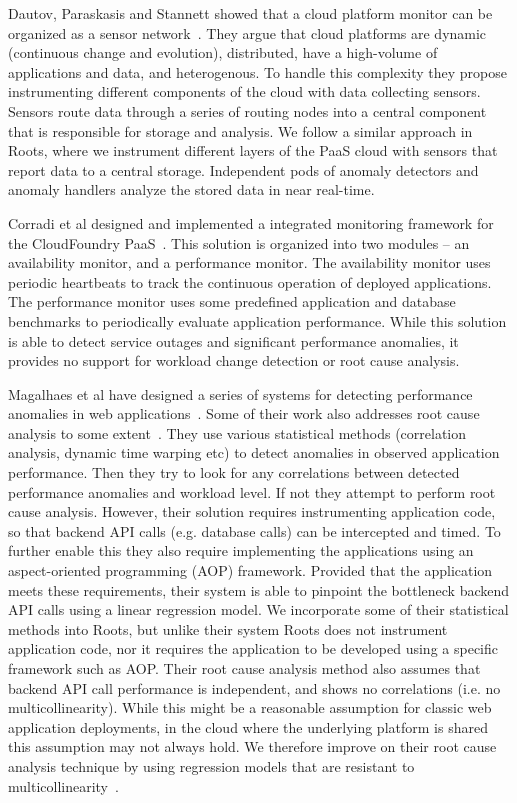 Dautov, Paraskasis and Stannett showed that a cloud platform monitor
can be organized as a sensor network~\cite{Dautov2014}. 
They argue that cloud platforms are 
dynamic (continuous change and evolution), distributed, have a high-volume
of applications and data, and heterogenous. To handle this complexity
they propose instrumenting different components of the cloud with
data collecting sensors. Sensors route data through a series of routing 
nodes into a central component that is responsible for storage
and analysis. We follow a similar approach in Roots, where we
instrument different layers of the PaaS cloud with sensors that
report data to a central storage. Independent pods of anomaly
detectors and anomaly handlers analyze the stored data in near
real-time.

Corradi et al designed and implemented a integrated monitoring
framework for the CloudFoundry PaaS~\cite{6912627}. This solution is organized
into two modules -- an availability monitor, and a performance
monitor. The availability monitor uses periodic heartbeats to
track the continuous operation of deployed applications. The
performance monitor uses some predefined application and
database benchmarks to periodically evaluate application performance.
While this solution is able to detect service outages and significant
performance anomalies, it provides no support for workload change
detection or root cause analysis.

Magalhaes et al have designed a series of systems for detecting
performance anomalies in web applications~\cite{5598229}. Some of their work
also addresses root cause analysis to some extent~\cite{Magalhaes:2011:RAP:1982185.1982234}. 
They use
various statistical methods (correlation analysis, dynamic time
warping etc) to detect anomalies in observed application
performance. Then they try to look for any correlations between
detected performance anomalies and workload level. If not
they attempt to perform root cause analysis. However, their
solution requires instrumenting application code, so that
backend API calls (e.g. database calls) can be intercepted and timed. To further
enable this they also require implementing the applications 
using an aspect-oriented programming (AOP) framework. Provided that
the application meets these requirements, their system is able to
pinpoint the bottleneck backend API calls using a linear regression
model. We incorporate some of their statistical methods into Roots,
but unlike their system Roots does not instrument application code, nor
it requires the application to be developed using a specific framework
such as AOP. Their root cause analysis method also assumes that
backend API call performance is independent, and shows no correlations
(i.e. no multicollinearity).
While this might be a reasonable assumption for classic web application
deployments, in the cloud where the underlying platform is shared
this assumption may not always hold. We therefore improve on their
root cause analysis technique by using regression models that are
resistant to multicollinearity~\cite{JSSv017i01}.

